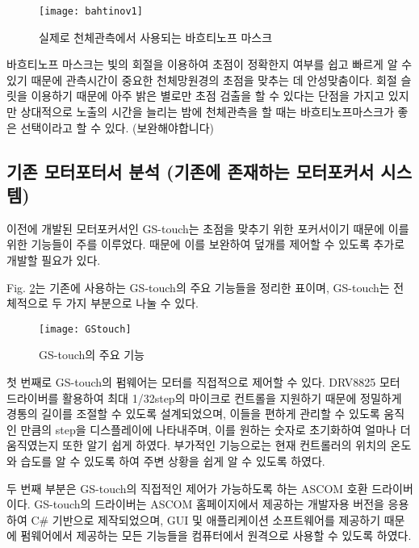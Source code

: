 \begin{figure}[h]
	\begin{center}
		\texttt{[image: bahtinov1]}
	\end{center}
	\caption{실제로 천체관측에서 사용되는 바흐티노프 마스크}
	\label{bahtinov}
\end{figure}

바흐티노프 마스크는 빛의 회절을 이용하여 초점이 정확한지 여부를  쉽고 빠르게 알 수 있기 때문에 관측시간이 중요한 천체망원경의 초점을 맞추는 데 안성맞춤이다. 회절 슬릿을 이용하기 때문에 아주 밝은 별로만 초점 검출을 할 수 있다는 단점을 가지고 있지만 상대적으로 노출의 시간을 늘리는 밤에 천체관측을 할 때는 바흐티노프마스크가 좋은 선택이라고 할 수 있다.
(보완해야합니다)


\subsection{기존 모터포터서 분석 (기존에 존재하는 모터포커서 시스템)}


이전에 개발된 모터포커서인 GS-touch는 초점을 맞추기 위한 포커서이기 때문에 이를 위한 기능들이 주를 이루었다. 때문에 이를 보완하여 덮개를 제어할 수 있도록 추가로 개발할 필요가 있다.


Fig. \ref{GStocuh}는 기존에 사용하는 GS-touch의 주요 기능들을 정리한 표이며, GS-touch는 전체적으로 두 가지 부분으로 나눌 수 있다.
\bigskip
\begin{figure}[h]
	\begin{center}
		\texttt{[image: GStouch]}
	\end{center}
	\caption{GS-touch의 주요 기능}
	\label{GStocuh}
\end{figure}

첫 번째로 GS-touch의 펌웨어는 모터를 직접적으로 제어할 수 있다. DRV8825 모터 드라이버를 활용하여 최대 1/32step의 마이크로 컨트롤을 지원하기 때문에 정밀하게 경통의 길이를 조절할 수 있도록 설계되었으며, 이들을 편하게 관리할 수 있도록 움직인 만큼의 step을 디스플레이에 나타내주며, 이를 원하는 숫자로 초기화하여 얼마나 더 움직였는지 또한 알기 쉽게 하였다. 부가적인 기능으로는 현재 컨트롤러의 위치의 온도와 습도를 알 수 있도록 하여 주변 상황을 쉽게 알 수 있도록 하였다.

두 번째 부분은 GS-touch의 직접적인 제어가 가능하도록 하는 ASCOM 호환 드라이버이다. GS-touch의 드라이버는 ASCOM 홈페이지에서 제공하는 개발자용 버전을 응용하여 C\# 기반으로 제작되었으며, GUI 및 애플리케이션 소프트웨어를 제공하기 때문에 펌웨어에서 제공하는 모든 기능들을 컴퓨터에서 원격으로 사용할 수 있도록 하였다.



